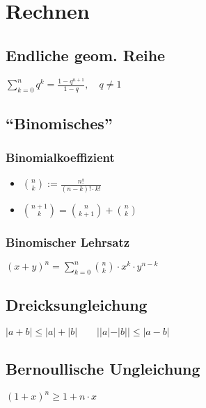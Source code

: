 \section*{Rechnen}

\subsection*{Endliche geom. Reihe}
$\displaystyle \sum_{k=0}^n q^k = \frac{1-q^{n+1}}{1-q}, \quad q \neq 1$

\subsection*{\enquote{Binomisches}}

\subsubsection*{Binomialkoeffizient}
\begin{itemize}
	\item $\binom{n}{k} := \frac{n!}{(n-k)!\cdot k!}$
	\item $\binom{n+1}{k}=\binom{n}{k+1}+\binom{n}{k}$
\end{itemize}

\subsubsection*{Binomischer Lehrsatz}
$\displaystyle (x+y)^n = \sum_{k=0}^n \binom{n}{k}\cdot x^k \cdot y^{n-k}$

\subsection*{Dreicksungleichung}
$|a+b|\le|a| + |b| \qquad ||a|-|b|| \le |a - b|$

\subsection*{Bernoullische Ungleichung}
$(1+x)^n \ge 1 + n \cdot x$
